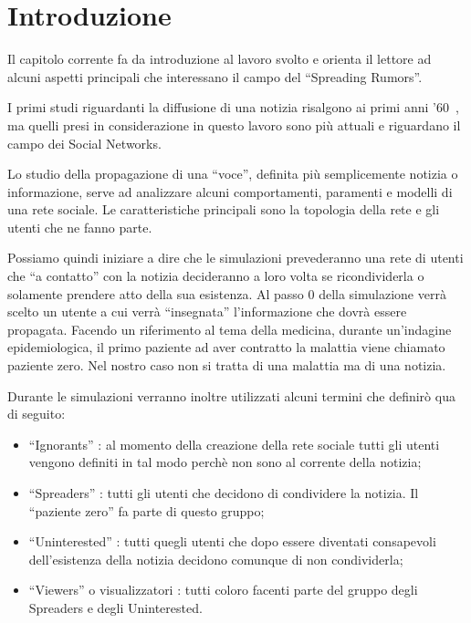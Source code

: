 \section{Introduzione}
\label{section:introduzione}

\vspace{10 mm}

Il capitolo corrente fa da introduzione al lavoro svolto e orienta il lettore 
ad alcuni aspetti principali che interessano il campo del ``Spreading Rumors''.

I primi studi riguardanti la diffusione di una notizia risalgono ai primi anni '60~\cite{biblio:stochastic_rumours}, 
ma quelli presi in considerazione in questo lavoro sono più attuali e riguardano il campo dei Social Networks.

Lo studio della propagazione di una ``voce'', definita più semplicemente notizia o informazione, 
serve ad analizzare alcuni comportamenti, paramenti e modelli di una rete sociale.
Le caratteristiche principali sono la topologia della rete e gli utenti che ne fanno parte.

Possiamo quindi iniziare a dire che le simulazioni prevederanno una rete di utenti che ``a contatto'' con
la notizia decideranno a loro volta se ricondividerla o solamente prendere atto della sua esistenza.
Al passo 0 della simulazione verrà scelto un utente a cui verrà ``insegnata'' l'informazione 
che dovrà essere propagata. 
Facendo un riferimento al tema della medicina, durante un'indagine epidemiologica, il primo paziente ad aver 
contratto la malattia viene chiamato paziente zero.
Nel nostro caso non si tratta di una malattia ma di una notizia.

Durante le simulazioni verranno inoltre utilizzati alcuni termini che definirò qua di seguito:
\begin{itemize}
 \item ``Ignorants'' : al momento della creazione della rete sociale tutti gli utenti vengono definiti 
 in tal modo perchè non sono al corrente della notizia;
 \item ``Spreaders'' : tutti gli utenti che decidono di condividere la notizia. 
 Il ``paziente zero'' fa parte di questo gruppo;
 \item ``Uninterested'' : tutti quegli utenti che dopo essere diventati consapevoli dell'esistenza 
 della notizia decidono comunque di non condividerla;
 \item ``Viewers'' o visualizzatori : tutti coloro facenti parte del gruppo degli Spreaders e degli Uninterested.
\end{itemize}

